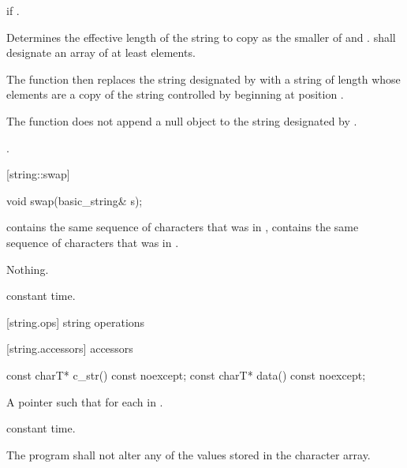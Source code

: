 \begin{itemdescr}
\pnum
\requires
{}

\pnum
\throws
{}
if
.

\pnum
\effects
Determines the effective length 
of the string to copy as the smaller of  and
.
 shall designate an array of at least  elements.

The function then replaces the string designated by 
with a string of length  whose elements are a copy of the
string controlled by
beginning at position .

The function does not append a null object to the string designated
by .

\pnum
\returns
{}.
\end{itemdescr}

[string::swap]{}

%
%
\begin{itemdecl}
void swap(basic_string& s);
\end{itemdecl}

\begin{itemdescr}
\pnum
\postcondition
{}
contains the same sequence of characters that was in ,
 contains the same sequence of characters that was in
.

\pnum
\throws Nothing.

\pnum
\complexity
constant time.
\end{itemdescr}

[string.ops]{ string operations}

[string.accessors]{ accessors}

%
%
\begin{itemdecl}
const charT* c_str() const noexcept;
const charT* data() const noexcept;
\end{itemdecl}

\begin{itemdescr}
\pnum
\returns A pointer  such that  for each
 in .

\pnum
\complexity constant time.

\pnum
\requires
The program shall not alter any of the values stored in the character array.
\end{itemdescr}


